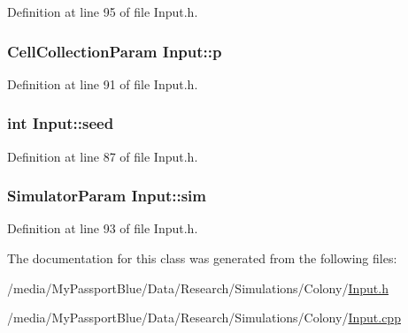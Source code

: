 \-Definition at line 95 of file \-Input.\-h.

\hypertarget{class_input_a2d15599a9c23b27330ae868928d2997d}{
\subsubsection[{p}]{\setlength{\rightskip}{0pt plus 5cm}\-Cell\-Collection\-Param {\bf \-Input\-::p}}}\label{class_input_a2d15599a9c23b27330ae868928d2997d}


\-Definition at line 91 of file \-Input.\-h.

\hypertarget{class_input_a9ba0dddeba07d5be04e894c6ceecd6d9}{
\subsubsection[{seed}]{\setlength{\rightskip}{0pt plus 5cm}int {\bf \-Input\-::seed}}}\label{class_input_a9ba0dddeba07d5be04e894c6ceecd6d9}


\-Definition at line 87 of file \-Input.\-h.

\hypertarget{class_input_acc3f4f428e3a7e40eec817496ad85deb}{
\subsubsection[{sim}]{\setlength{\rightskip}{0pt plus 5cm}\-Simulator\-Param {\bf \-Input\-::sim}}}\label{class_input_acc3f4f428e3a7e40eec817496ad85deb}


\-Definition at line 93 of file \-Input.\-h.



\-The documentation for this class was generated from the following files\-:\begin{DoxyCompactItemize}
\item 
/media/\-My\-Passport\-Blue/\-Data/\-Research/\-Simulations/\-Colony/\hyperlink{_input_8h}{\-Input.\-h}\item 
/media/\-My\-Passport\-Blue/\-Data/\-Research/\-Simulations/\-Colony/\hyperlink{_input_8cpp}{\-Input.\-cpp}\end{DoxyCompactItemize}
